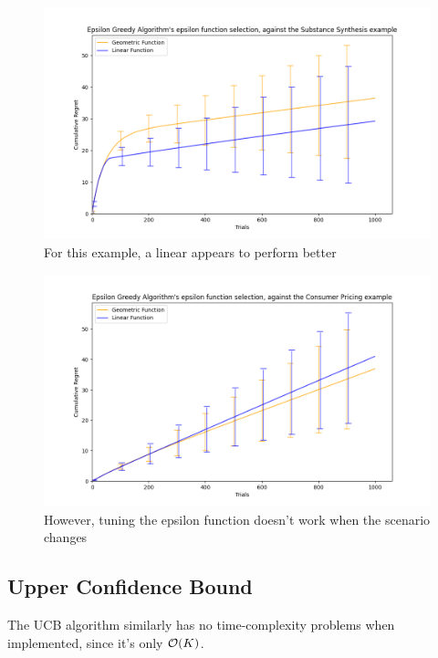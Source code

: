 \begin{figure}[h!]
    \centering
    \includegraphics[width=17cm]{report/images/Epsilon-Greedy-Linear-Geometric.png}
    \caption{For this example, a linear \epsilonFunction \space appears to perform better}
    \label{fig:epsilon-linear}
\end{figure}

\begin{figure}[h!]
    \centering
    \includegraphics[width=17cm]{report/images/Epsilon-Greedy-Linear-Geometric-CP.png}
    \caption{However, tuning the epsilon function doesn't work when the scenario changes}
    \label{fig:epsilon-linear-cp}
\end{figure}


\subsection{Upper Confidence Bound}

The UCB algorithm similarly has no time-complexity problems when implemented, since it's only $\mathcal{O}(K)$.

